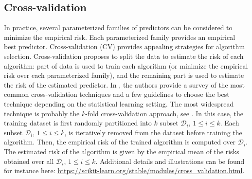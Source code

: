 \subsection*{Cross-validation} 
In practice, several parameterized families of predictors can be considered to minimize the empirical risk. Each parameterized family provides an empirical best predictor. Cross-validation (CV) provides appealing strategies for algorithm selection. Cross-validation proposes to split the data to estimate the risk of each algorithm: part of data  is used  to train each
algorithm (or minimize the empirical risk over each parameterized family), and the remaining part is used to estimate
the risk of the estimated predictor.  In \cite{arlot2010survey}, the authors provide a survey of the most common cross-validation techniques and a few  guidelines to choose the best technique depending on the statistical learning setting. The most widespread technique is probably the $k$-fold cross-validation approach, see \cite{geisser1975predictive}. In this case, the training dataset is first randomly  partitioned into $k$ subset $\mathcal{D}_i$, $1\leqslant i \leqslant k$. Each subset $\mathcal{D}_i$, $1\leqslant i \leqslant k$,  is iteratively removed from the dataset before training the algorithm. Then, the empirical risk of the trained algorithm is computed over $\mathcal{D}_i$. The estimated risk of the algorithm is given by the empirical mean of the risks obtained  over all $\mathcal{D}_i$, $1\leqslant i \leqslant k$. Additional details and illustrations can be found for instance here: \url{https://scikit-learn.org/stable/modules/cross\_validation.html}.



